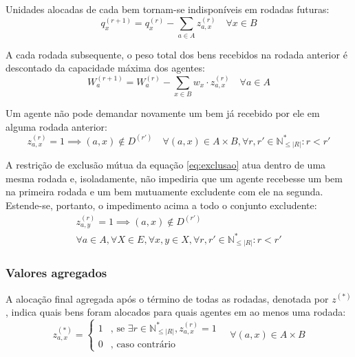 \documentclass[
    12pt,
    openany,
    oneside,
    a4paper,
    english,
    brazil
]{abntex2}
\begin{document}
Unidades alocadas de cada bem tornam-se indisponíveis em rodadas futuras:
\begin{equation}
    q_{x}^{(r + 1)} = q_x^{(r)} - \sum_{a \in A} z_{a,x}^{(r)}
    \quad \forall x \in B
\end{equation}

A cada rodada subsequente, o peso total dos bens recebidos na rodada anterior é descontado da capacidade máxima dos agentes:
\begin{equation}
    W_{a}^{(r + 1)} = W_a^{(r)} - \sum_{x \in B} w_{x} \cdot z_{a,x}^{(r)}
    \quad \forall a \in A
\end{equation}

Um agente não pode demandar novamente um bem já recebido por ele em alguma rodada anterior:
\begin{equation}
    z_{a, x}^{(r)} = 1 \implies (a, x) \notin D^{(r')}
    \quad \forall (a, x) \in A \times B, \forall r, r'\in \mathbb{N}^*_{\leq |R|} : r < r'
\end{equation}

A restrição de exclusão mútua da equação \eqref{eq:exclusao} atua dentro de uma mesma rodada e, isoladamente, não impediria que um agente recebesse um bem na primeira rodada e um bem mutuamente excludente com ele na segunda. Estende-se, portanto, o impedimento acima a todo o conjunto excludente:
\begin{equation}
\begin{aligned}
    z_{a, y}^{(r)} = 1 \implies (a, x) \notin D^{(r')} \\
    \forall a \in A, \forall X \in E, \forall x, y \in X, \forall r, r'\in \mathbb{N}^*_{\leq |R|} : r < r'
\end{aligned}
\end{equation}

\subsubsection{Valores agregados}

A alocação final agregada após o término de todas as rodadas, denotada por $z^{(*)}$, indica quais bens foram alocados para quais agentes em ao menos uma rodada:
\begin{equation}
    z_{a, x}^{(*)} =
    \begin{cases}
        1 & \text{, se } \exists r \in \mathbb{N}^*_{\leq |R|}, z_{a, x}^{(r)} = 1 \\
        0 & \text{, caso contrário}
    \end{cases}
    \quad
    \forall (a, x) \in A \times B
\end{equation}
\end{document}
